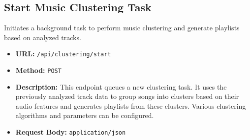 \documentclass{article}
\begin{document}
\subsection{Start Music Clustering Task}
Initiates a background task to perform music clustering and generate playlists based on analyzed tracks.
\begin{itemize}[noitemsep]
    \item \textbf{URL:} \verb|/api/clustering/start|
    \item \textbf{Method:} \texttt{POST}
    \item \textbf{Description:} This endpoint queues a new clustering task. It uses the previously analyzed track data to group songs into clusters based on their audio features and generates playlists from these clusters. Various clustering algorithms and parameters can be configured.
    \item \textbf{Request Body:} \texttt{application/json}
\end{itemize}
\end{document}
